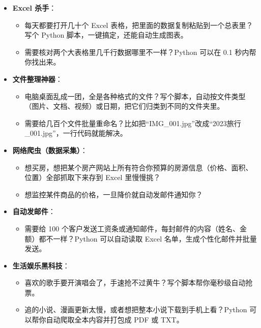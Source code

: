 \begin{itemize}
    \item \textbf{Excel 杀手}：
    \begin{itemize}
        \item 每天都要打开几十个 Excel 表格，把里面的数据复制粘贴到一个总表里？写个 Python 脚本，一键搞定，还能自动生成图表。
        \item 需要核对两个大表格里几千行数据哪里不一样？Python 可以在 0.1 秒内帮你找出来。
    \end{itemize}
    
    \item \textbf{文件整理神器}：
    \begin{itemize}
        \item 电脑桌面乱成一团，全是各种格式的文件？写个脚本，自动按文件类型（图片、文档、视频）或日期，把它们归类到不同的文件夹里。
        \item 需要给几百个文件批量重命名？比如把“IMG\_001.jpg”改成“2023旅行\_001.jpg”，一行代码就能解决。
    \end{itemize}
\newpage


    \item \textbf{网络爬虫（数据采集）}：
    \begin{itemize}
        \item 想买房，想把某个房产网站上所有符合你预算的房源信息（价格、面积、位置）全部抓取下来存到 Excel 里慢慢挑？
        \item 想监控某件商品的价格，一旦降价就自动发邮件通知你？
    \end{itemize}

    \item \textbf{自动发邮件}：
    \begin{itemize}
        \item 需要给 100 个客户发送工资条或通知邮件，每封邮件的内容（姓名、金额）都不一样？Python 可以自动读取 Excel 名单，生成个性化邮件并批量发送。
    \end{itemize}

    \item \textbf{生活娱乐黑科技}：
    \begin{itemize}
        \item 喜欢的歌手要开演唱会了，手速抢不过黄牛？写个脚本帮你毫秒级自动抢票。
        \item 追的小说、漫画更新太慢，或者想把整本小说下载到手机上看？Python 可以帮你自动爬取全本内容并打包成 PDF 或 TXT。
    \end{itemize}
\end{itemize}


